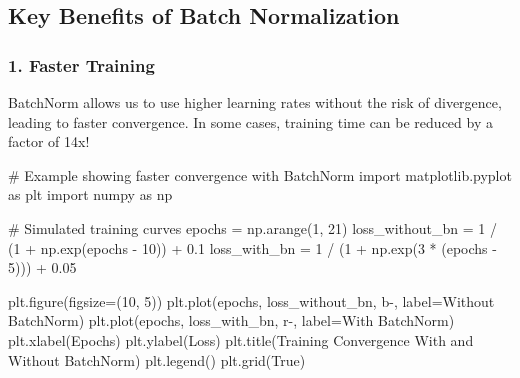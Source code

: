 \documentclass[
  letterpaper,
  DIV=11,
  numbers=noendperiod]{scrreprt}
\newenvironment{Shaded}{\begin{snugshade}}{\end{snugshade}}
\newcommand{\CommentTok}[1]{\textcolor[rgb]{0.37,0.37,0.37}{#1}}
\newcommand{\DecValTok}[1]{\textcolor[rgb]{0.68,0.00,0.00}{#1}}
\newcommand{\FloatTok}[1]{\textcolor[rgb]{0.68,0.00,0.00}{#1}}
\newcommand{\ImportTok}[1]{\textcolor[rgb]{0.00,0.46,0.62}{#1}}
\newcommand{\NormalTok}[1]{\textcolor[rgb]{0.00,0.23,0.31}{#1}}
\newcommand{\OperatorTok}[1]{\textcolor[rgb]{0.37,0.37,0.37}{#1}}
\newcommand{\StringTok}[1]{\textcolor[rgb]{0.13,0.47,0.30}{#1}}
\newcommand{\VariableTok}[1]{\textcolor[rgb]{0.07,0.07,0.07}{#1}}
\begin{document}
\subsection{Key Benefits of Batch
Normalization}\label{key-benefits-of-batch-normalization}

\subsubsection{1. Faster Training}\label{faster-training}

BatchNorm allows us to use higher learning rates without the risk of
divergence, leading to faster convergence. In some cases, training time
can be reduced by a factor of 14x!

\begin{Shaded}
\begin{Highlighting}[]
\CommentTok{\# Example showing faster convergence with BatchNorm}
\ImportTok{import}\NormalTok{ matplotlib.pyplot }\ImportTok{as}\NormalTok{ plt}
\ImportTok{import}\NormalTok{ numpy }\ImportTok{as}\NormalTok{ np}

\CommentTok{\# Simulated training curves}
\NormalTok{epochs }\OperatorTok{=}\NormalTok{ np.arange(}\DecValTok{1}\NormalTok{, }\DecValTok{21}\NormalTok{)}
\NormalTok{loss\_without\_bn }\OperatorTok{=} \DecValTok{1} \OperatorTok{/}\NormalTok{ (}\DecValTok{1} \OperatorTok{+}\NormalTok{ np.exp(epochs }\OperatorTok{{-}} \DecValTok{10}\NormalTok{)) }\OperatorTok{+} \FloatTok{0.1}
\NormalTok{loss\_with\_bn }\OperatorTok{=} \DecValTok{1} \OperatorTok{/}\NormalTok{ (}\DecValTok{1} \OperatorTok{+}\NormalTok{ np.exp(}\DecValTok{3} \OperatorTok{*}\NormalTok{ (epochs }\OperatorTok{{-}} \DecValTok{5}\NormalTok{))) }\OperatorTok{+} \FloatTok{0.05}

\NormalTok{plt.figure(figsize}\OperatorTok{=}\NormalTok{(}\DecValTok{10}\NormalTok{, }\DecValTok{5}\NormalTok{))}
\NormalTok{plt.plot(epochs, loss\_without\_bn, }\StringTok{\textquotesingle{}b{-}\textquotesingle{}}\NormalTok{, label}\OperatorTok{=}\StringTok{\textquotesingle{}Without BatchNorm\textquotesingle{}}\NormalTok{)}
\NormalTok{plt.plot(epochs, loss\_with\_bn, }\StringTok{\textquotesingle{}r{-}\textquotesingle{}}\NormalTok{, label}\OperatorTok{=}\StringTok{\textquotesingle{}With BatchNorm\textquotesingle{}}\NormalTok{)}
\NormalTok{plt.xlabel(}\StringTok{\textquotesingle{}Epochs\textquotesingle{}}\NormalTok{)}
\NormalTok{plt.ylabel(}\StringTok{\textquotesingle{}Loss\textquotesingle{}}\NormalTok{)}
\NormalTok{plt.title(}\StringTok{\textquotesingle{}Training Convergence With and Without BatchNorm\textquotesingle{}}\NormalTok{)}
\NormalTok{plt.legend()}
\NormalTok{plt.grid(}\VariableTok{True}\NormalTok{)}
\end{Highlighting}
\end{Shaded}
\end{document}
